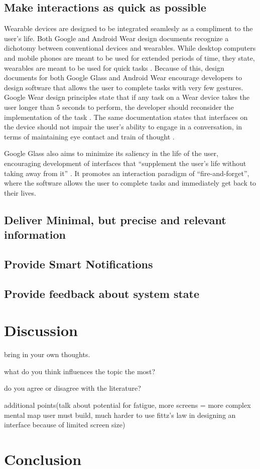 \documentclass[12pt]{article}
\begin{document}
\subsection{Make interactions as quick as possible}
Wearable devices are designed to be integrated seamlesly as a compliment to the user's life. Both Google and Android Wear design documents recognize a dichotomy between conventional devices and wearables. While desktop computers and mobile phones are meant to be used for extended periods of time, they state, wearables are meant to be used for quick tasks \cite{andr} \cite{goog}. Because of this, design documents for both Google Glass and Android Wear encourage developers to design software that allows the user to complete tasks with very few gestures. Google Wear design principles state that if any task on a Wear device takes the user longer than 5 seconds to perform, the developer should reconsider the implementation of the task \cite{andr}. The same documentation states that interfaces on the device should not impair the user's ability to engage in a conversation, in terms of maintaining eye contact and train of thought \cite{andr}.

Google Glass also aims to minimize its saliency in the life of the user, encouraging development of interfaces that ``supplement the user's life without taking away from it'' \cite{goog}. It promotes an interaction paradigm of ``fire-and-forget'', where the software allows the user to complete tasks and immediately get back to their lives.

\subsection{Deliver Minimal, but precise and relevant information}

\subsection{Provide Smart Notifications}

\subsection{Provide feedback about system state}

\section{Discussion}

bring in your own thoughts. 

what do you think influences the topic the most?

do you agree or disagree with the literature?

additional points(talk about potential for fatigue, more screens = more complex mental map user must build, much harder to use fittz's law in designing an interface because of limited screen size)

\section{Conclusion}



\end{document}
